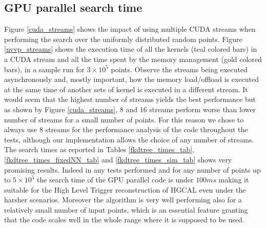 \subsection{GPU parallel search time}
Figure \ref{cuda_streams} shows the impact of using multiple CUDA streams when performing the search over the uniformly distributed random points. Figure \ref{nvvp_streams} shows the execution time of all the kernels (teal colored bars) in a CUDA stream and all the time spent by the memory management (gold colored bars), in a sample run for $3 \times 10^5$ points. Observe the streams being executed asynchronously and, mostly important, how the memory load/offload is executed at the same time of another sets of kernel is executed in a different stream. It would seem that the highest number of streams yields the best performance but as shown by Figure \ref{cuda_streams}, 8 and 16 streams perform worse than lower number of streams for a small number of points. For this reason we chose to always use 8 streams for the performance analysis of the code throughout the tests, although our implementation allows the choice of any number of streams.\\
The search times as reported in Tables \ref{fkdtree_times_tab}, \ref{fkdtree_times_fixedNN_tab} and \ref{fkdtree_times_sim_tab} shows very promising results. Indeed in any tests performed and for any number of points up to $5 \times 10^5$ the search time of the GPU parallel code is under $100 \unit{ms}$ making it suitable for the High Level Trigger reconstruction of HGCAL even under the harsher scenarios. Moreover the algorithm is very well performing also for a relatively small number of input points, which is an essential feature granting that the code scales well in the whole range where it is supposed to be used.

